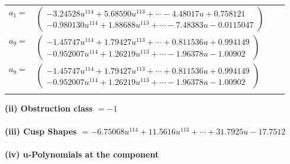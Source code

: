 \documentclass[1p]{elsarticle_modified}
\theoremstyle{definition}
\begin{document}
\begin{tabular}{m{7pt} m{180pt} m{7pt} m{180pt} }
\flushright $a_{1}=$&$\begin{pmatrix}-3.24528 u^{114}+5.68590 u^{113}+\cdots-4.48017 u+0.758121\\-0.980130 u^{114}+1.88688 u^{113}+\cdots-7.48383 u-0.0115047\end{pmatrix}$ \\
\flushright $a_{9}=$&$\begin{pmatrix}-1.45747 u^{114}+1.79427 u^{113}+\cdots+0.811536 u+0.994149\\-0.952007 u^{114}+1.26219 u^{113}+\cdots-1.96378 u-1.00902\end{pmatrix}$\\ \flushright $a_{9}=$&$\begin{pmatrix}-1.45747 u^{114}+1.79427 u^{113}+\cdots+0.811536 u+0.994149\\-0.952007 u^{114}+1.26219 u^{113}+\cdots-1.96378 u-1.00902\end{pmatrix}$\\&\end{tabular}
\flushleft \textbf{(ii) Obstruction class $= -1$}\\~\\
\flushleft \textbf{(iii) Cusp Shapes $= -6.75068 u^{114}+11.5616 u^{113}+\cdots+31.7925 u-17.7512$}\\~\\
\newpage\renewcommand{\arraystretch}{1}
\flushleft \textbf{(iv) u-Polynomials at the component}\newline \\
\end{document}

